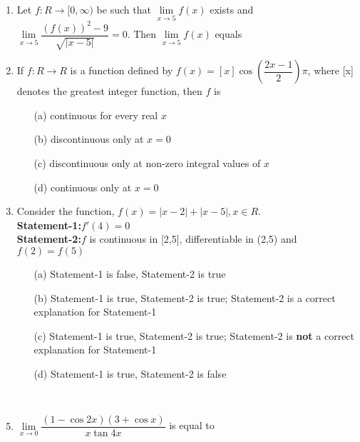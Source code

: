 \documentclass[journal,12pt,twocolumn]{IEEEtran}
\begin{document}
\begin{enumerate}
\item Let $f:R \to [0,\infty)$ be such that $\lim\limits_{x \to 5}f(x)$ exists and $\lim\limits_{x \to 5}\dfrac{(f(x))^2-9}{\sqrt{|x-5|}}=0$. Then $\lim\limits_{x \to 5}f(x)$ equals
\begin{itemize}
\end{itemize}

\item If $f:R \to R$ is a function defined by $f(x)=[x]\cos\left(\dfrac{2x-1}{2}\right)\pi$, where [x] denotes the greatest integer function, then $f$ is
\begin{itemize}
\item[(a)] continuous for every real $x$
\item[(b)] discontinuous only at $x=0$
\item[(c)] discontinuous only at non-zero integral values of $x$
\item[(d)] continuous only at $x=0$\\
\end{itemize}

\item Consider the function, $f(x)=|x-2|+|x-5|, x \in R$.\\
\textbf{Statement-1:}$f'(4)=0$\\
\textbf{Statement-2:}$f$ is continuous in [2,5], differentiable in (2,5) and $f(2)=f(5)$
\begin{itemize}
\item[(a)] Statement-1 is false, Statement-2 is true
\item[(b)] Statement-1 is true, Statement-2 is true; Statement-2 is a correct explanation for Statement-1
\item[(c)] Statement-1 is true, Statement-2 is true; Statement-2 is \textbf{not} a correct explanation for Statement-1
\item[(d)] Statement-1 is true, Statement-2 is false
\end{itemize} \item[~]

\item $\lim\limits_{x \to 0}\dfrac{(1-\cos 2x)(3+\cos x)}{x\tan 4x}$ is equal to
\begin{itemize}
\end{itemize} \item[~]


\end{enumerate}
\end{document}

